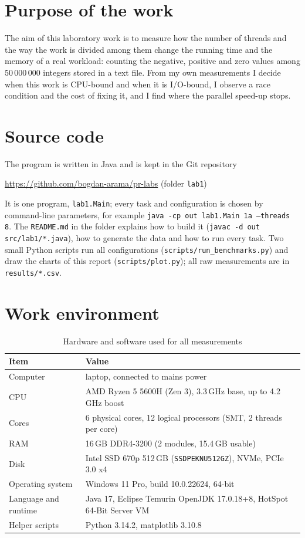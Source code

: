 \section{Purpose of the work}

The aim of this laboratory work is to measure how the number of threads and the way the work is
divided among them change the running time and the memory of a real workload: counting the
negative, positive and zero values among 50\,000\,000 integers stored in a text file. From my own
measurements I decide when this work is CPU-bound and when it is I/O-bound, I observe a race
condition and the cost of fixing it, and I find where the parallel speed-up stops.

\section{Source code}

The program is written in Java and is kept in the Git repository
\begin{center}
\url{https://github.com/bogdan-arama/pr-labs} \quad (folder \texttt{lab1})
\end{center}
It is one program, \texttt{lab1.Main}; every task and configuration is chosen by command-line
parameters, for example \texttt{java -cp out lab1.Main 1a --threads 8}. The
\texttt{README.md} in the folder explains how to build it (\texttt{javac -d out src/lab1/*.java}),
how to generate the data and how to run every task. Two small Python scripts run all
configurations (\texttt{scripts/run\_benchmarks.py}) and draw the charts of this report
(\texttt{scripts/plot.py}); all raw measurements are in \texttt{results/*.csv}.

\section{Work environment}

\begin{table}[H]
\centering\small
\begin{tabular}{@{}ll@{}}
\toprule
Item & Value \\
\midrule
Computer & laptop, connected to mains power \\
CPU & AMD Ryzen 5 5600H (Zen 3), 3.3\,GHz base, up to 4.2\,GHz boost \\
Cores & 6 physical cores, 12 logical processors (SMT, 2 threads per core) \\
RAM & 16\,GB DDR4-3200 (2 modules, 15.4\,GB usable) \\
Disk & Intel SSD 670p 512\,GB (\texttt{SSDPEKNU512GZ}), NVMe, PCIe 3.0 x4 \\
Operating system & Windows 11 Pro, build 10.0.22624, 64-bit \\
Language and runtime & Java 17, Eclipse Temurin OpenJDK 17.0.18+8, HotSpot 64-Bit Server VM \\
Helper scripts & Python 3.14.2, matplotlib 3.10.8 \\
\bottomrule
\end{tabular}
\caption{Hardware and software used for all measurements}
\end{table}

